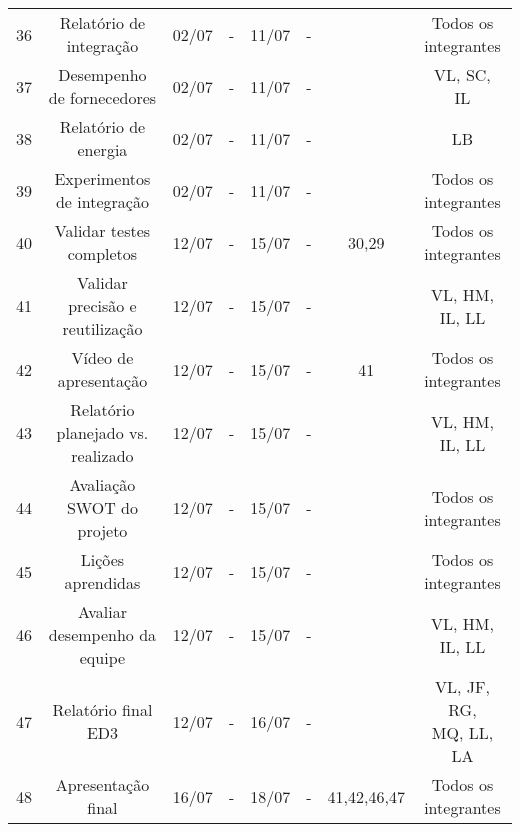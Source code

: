 \begin{table}[htpb]
\begin{tabular}{|c|c|c|c|c|c|c|c|}
36 & Relatório de integração & 02/07 & - & 11/07 & - &  & Todos os integrantes \\
37 & Desempenho de fornecedores & 02/07 & - & 11/07 & - &  & \makecell{VL, SC, \\ IL} \\
38 & Relatório de energia & 02/07 & - & 11/07 & - &  & LB \\
39 & Experimentos de integração & 02/07 & - & 11/07 & - &  & Todos os integrantes \\
40 & Validar testes completos & 12/07 & - & 15/07 & - & 30,29 & Todos os integrantes \\
41 & Validar precisão e reutilização & 12/07 & - & 15/07 & - &  & \makecell{VL, HM, \\ IL, LL} \\
42 & Vídeo de apresentação & 12/07 & - & 15/07 & - & 41 & Todos os integrantes \\
43 & Relatório planejado vs. realizado & 12/07 & - & 15/07 & - &  & \makecell{VL, HM, \\ IL, LL} \\
44 & Avaliação SWOT do projeto & 12/07 & - & 15/07 & - &  & Todos os integrantes \\
45 & Lições aprendidas & 12/07 & - & 15/07 & - &  & Todos os integrantes \\
46 & Avaliar desempenho da equipe & 12/07 & - & 15/07 & - &  & \makecell{VL, HM, \\ IL, LL} \\
47 & Relatório final ED3 & 12/07 & - & 16/07 & - &  & \makecell{VL, JF, RG, \\ MQ, LL, LA} \\
48 & Apresentação final & 16/07 & - & 18/07 & - & 41,42,46,47 & Todos os integrantes \\
\hline
\end{tabular}
\label{tab:cronograma2}
\end{table}






